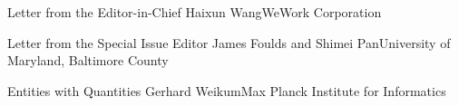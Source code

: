 \documentclass[11pt]{article}
\begin{document}


\begin{bulletin}


%
%

\begin{lettersection}


\begin{letter}{Letter from the Editor-in-Chief}
{Haixun Wang}{WeWork Corporation}

\end{letter}
%
\newpage
%
%
\begin{letter}{Letter from the Special Issue Editor}
{James Foulds and Shimei Pan}{University of Maryland, Baltimore County}


\end{letter}

\end{lettersection}


\begin{opinionsection}
\begin{opinion}{Entities with Quantities}
{Gerhard Weikum}{Max Planck Institute for Informatics}

\end{opinion}
\end{opinionsection}


\end{bulletin}
\end{document}
